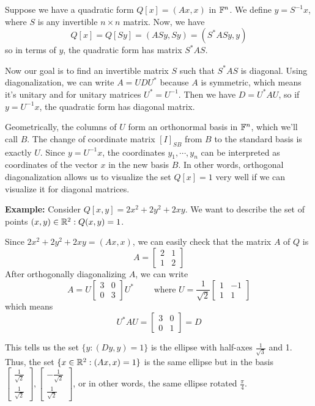 Suppose we have a quadratic form $Q[x] = (Ax, x)$ in $\mathbb{F}^{n}$. We define $y = S^{-1} x$, where $S$ is any invertible $n \times n$ matrix. Now, we have
$$Q[x] = Q[Sy] = (ASy, Sy) = (S^{*} AS y, y)$$
so in terms of $y$, the quadratic form has matrix $S^{*}AS$. 

Now our goal is to find an invertible matrix $S$ such that $S^{*} AS$ is diagonal. Using diagonalization, we can write $A = UDU^{*}$ because $A$ is symmetric, which means it's unitary and for unitary matrices $U^{*} = U^{-1}$. Then we have $D = U^{*} AU$, so if $y = U^{-1} x$, the quadratic form has diagonal matrix. 

Geometrically, the columns of $U$ form an orthonormal basis in $\mathbb{F}^{n}$, which we'll call $B$. The change of coordinate matrix $[I]_{SB}$ from $B$ to the standard basis is exactly $U$. Since $y = U^{-1} x$, the coordinates $y_{1}, \cdots, y_{n}$ can be interpreted as coordinates of the vector $x$ in the new basis $B$. In other words, orthogonal diagonalization allows us to visualize the set $Q[x] = 1$ very well if we can visualize it for diagonal matrices. 

\textbf{Example:} Consider $Q[x, y] = 2x^{2} + 2y^{2} + 2xy$. We want to describe the set of points $(x, y) \in \mathbb{R}^{2} : Q(x, y) = 1$. 

Since $2x^{2} + 2y^{2} + 2xy = (Ax, x)$, we can easily check that the matrix $A$ of $Q$ is 
$$A = \begin{bmatrix}
2 & 1 \\
1 & 2
\end{bmatrix}$$ 
After orthogonally diagonalizing $A$, we can write 
$$A = U \begin{bmatrix}
3 & 0 \\
0 & 3
\end{bmatrix} U^{*} \qquad \text{ where } U = \frac{1}{\sqrt{2}} \begin{bmatrix}
1 & -1 \\
1 & 1
\end{bmatrix}$$
which means
$$U^{*} AU = \begin{bmatrix}
3 & 0 \\
0 & 1
\end{bmatrix} = D$$

This tells us the set $\{y : (Dy, y) = 1\}$ is the ellipse with half-axes $\frac{1}{\sqrt{3}}$ and 1. Thus, the set $\{x \in \mathbb{R}^{2}: (Ax, x) = 1 \}$ is the same ellipse but in the basis $\begin{bmatrix}
\frac{1}{\sqrt{2}} \\
\frac{1}{\sqrt{2}}
\end{bmatrix}, \begin{bmatrix}
-\frac{1}{\sqrt{2}} \\
\frac{1}{\sqrt{2}}
\end{bmatrix}$, or in other words, the same ellipse rotated $\frac{\pi}{4}$. 


